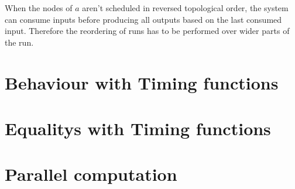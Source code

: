 When the nodes of \(a\) aren't scheduled in reversed topological order, the system can consume inputs before producing all outputs based on the last consumed input.
Therefore the reordering of runs has to be performed over wider parts of the run.

\section{Behaviour with Timing functions}
\section{Equalitys with Timing functions}
\section{Parallel computation}
